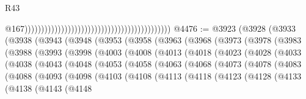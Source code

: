 \begin{lexlean}{R43}
\begin{coremodule}
                                                                                            @167))))))))))))))))))))))))))))))))))))))))))))
@4476 := @3923
    (@3928
      (@3933
        (@3938
          (@3943
            (@3948
              (@3953
                (@3958
                  (@3963
                    (@3968
                      (@3973
                        (@3978
                          (@3983
                            (@3988
                              (@3993
                                (@3998
                                  (@4003
                                    (@4008
                                      (@4013
                                        (@4018
                                          (@4023
                                            (@4028
                                              (@4033
                                                (@4038
                                                  (@4043
                                                    (@4048
                                                      (@4053
                                                        (@4058
                                                          (@4063
                                                            (@4068
                                                              (@4073
                                                                (@4078
                                                                  (@4083
                                                                    (@4088
                                                                      (@4093
                                                                        (@4098
                                                                          (@4103
                                                                            (@4108
                                                                              (@4113
                                                                                (@4118
                                                                                  (@4123
                                                                                    (@4128
                                                                                      (@4133
                                                                                        (@4138
                                                                                          (@4143
                                                                                            (@4148

\end{coremodule}
\end{lexlean}
